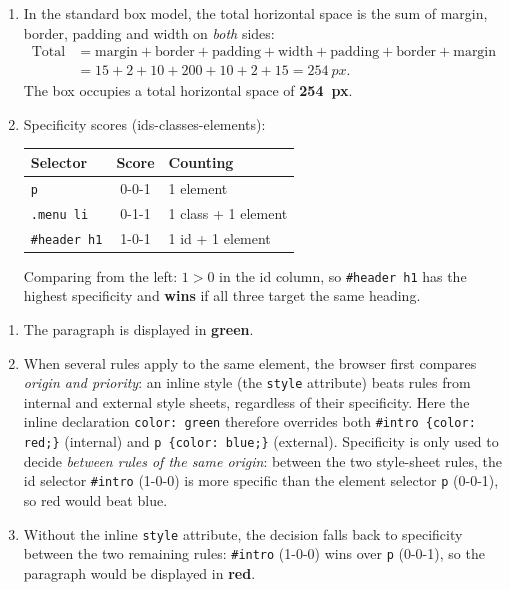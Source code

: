\documentclass[11pt]{article}
\newcommand{\cle}[1]{{\popxbold\color{popdark}#1}}
\begin{document}
\begin{corrige}
\begin{enumerate}
\item In the standard box model, the total horizontal space is the sum of margin, border, padding and width on \emph{both} sides:
\begin{align*}
\text{Total} &= \text{margin} + \text{border} + \text{padding} + \text{width} + \text{padding} + \text{border} + \text{margin}\\
&= 15 + 2 + 10 + 200 + 10 + 2 + 15 = \SI{254}{px}.
\end{align*}
The box occupies a total horizontal space of \textbf{\SI{254}{px}}.
\item Specificity scores (ids-classes-elements):
\begin{center}
\begin{tabularx}{\linewidth}{|l|c|X|}\hline
\rowcolor{popblueL} \textbf{Selector} & \textbf{Score} & \textbf{Counting} \\ \hline
\texttt{p} & 0-0-1 & 1 element \\ \hline
\texttt{.menu li} & 0-1-1 & 1 class + 1 element \\ \hline
\texttt{\#header h1} & 1-0-1 & 1 id + 1 element \\ \hline
\end{tabularx}
\end{center}
Comparing from the left: $1 > 0$ in the id column, so \texttt{\#header h1} has the highest specificity and \textbf{wins} if all three target the same heading.
\end{enumerate}
\end{corrige}

\begin{corrige}
\begin{enumerate}
\item The paragraph is displayed in \textbf{green}.
\item When several rules apply to the same element, the browser first compares \emph{origin and priority}: an \cle{inline style} (the \texttt{style} attribute) beats rules from internal and external style sheets, regardless of their specificity. Here the inline declaration \texttt{color: green} therefore overrides both \texttt{\#intro \{color: red;\}} (internal) and \texttt{p \{color: blue;\}} (external). Specificity is only used to decide \emph{between rules of the same origin}: between the two style-sheet rules, the id selector \texttt{\#intro} (1-0-0) is more specific than the element selector \texttt{p} (0-0-1), so red would beat blue.
\item Without the inline \texttt{style} attribute, the decision falls back to specificity between the two remaining rules: \texttt{\#intro} (1-0-0) wins over \texttt{p} (0-0-1), so the paragraph would be displayed in \textbf{red}.
\end{enumerate}
\end{corrige}
\end{document}
